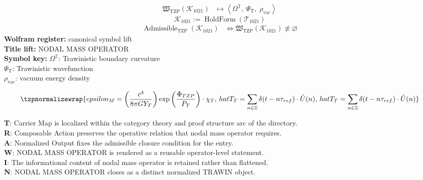 \noindent
\begin{minipage}[t]{0.48\linewidth}
\begingroup
\small
\[
\begin{aligned}
\mathfrak{W}_{\mathrm{TZP}}\!\left(\mathcal{K}_{1021}\right)
&\longmapsto
\left\langle \Omega^{\mathbb{T}},\; \Psi_{\mathrm{T}},\; \rho_{\mathrm{vac}} \right\rangle
\end{aligned}
\]
\[
\mathcal{K}_{1021}
:=
\operatorname{HoldForm}\!\left(\mathcal{T}_{1021}\right)
\]
\[
\begin{aligned}
\operatorname{Admissible}_{\mathrm{TZP}}\!\left(\mathcal{K}_{1021}\right)
&\Longleftrightarrow
\mathfrak{W}_{\mathrm{TZP}}\!\left(\mathcal{K}_{1021}\right)\not\equiv\varnothing
\end{aligned}
\]
\textbf{Wolfram register:} canonical symbol lift\\
\textbf{Title lift:} NODAL MASS OPERATOR\\
\textbf{Symbol key:} \(\Omega^{\mathbb{T}}\): Trawinistic boundary curvature\\ \(\Psi_{\mathrm{T}}\): Trawinistic wavefunction\\ \(\rho_{\mathrm{vac}}\): vacuum energy density
\par
\endgroup
\end{minipage}\hfill
\begin{minipage}[t]{0.48\linewidth}
\[
\tzpnormalizewrap{epsilon_M = \left( \frac{c^4}{8\pi G Y_T} \right) \exp\left(\frac{\Phi_{TZP}}{P_T}\right) \cdot \chi_T,\,hat{T}_T = \sum_{n \in \mathbb{Z}} \delta(t - n\tau_{ref}) \cdot \hat{U}(n),\,hat{T}_T = \sum_{n \in \mathbb{Z}} \delta(t - n\tau_{ref}) \cdot \hat{U}(n)}
\]

\small
\textbf{T}: Carrier Map is localized within the category theory and proof structure arc of the directory.\\
\textbf{R}: Composable Action preserves the operative relation that nodal mass operator requires.\\
\textbf{A}: Normalized Output fixes the admissible closure condition for the entry.\\
\textbf{W}: NODAL MASS OPERATOR is rendered as a reusable operator-level statement.\\
\textbf{I}: The informational content of nodal mass operator is retained rather than flattened.\\
\textbf{N}: NODAL MASS OPERATOR closes as a distinct normalized TRAWIN object.
\normalsize
\end{minipage}

